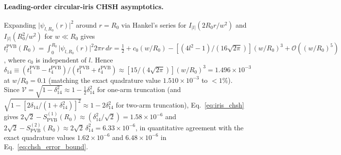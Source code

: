 \documentclass[aps,pra,onecolumn,notitlepage,11pt,tightenlines,nofootinbib,floatfix,longbibliography]{revtex4-2}
\newcommand{\abs}[1]{\lvert #1 \rvert}
\begin{document}
\paragraph*{Leading-order circular-iris CHSH asymptotics.}
Expanding $\abs{\psi_{l,R_0}(r)}^2$ around $r = R_0$ via Hankel's series for $I_{\abs{l}}(2R_0 r/w^2)$ and $I_{\abs{l}}(R_0^2/w^2)$ for $w \ll R_0$ gives $t_l^{\mathrm{PVB}}(R_0) = \int_0^{R_0}\abs{\psi_{l,R_0}(r)}^2 2\pi r\,dr = \frac{1}{2} + c_0(w/R_0) - [(4l^2 - 1)/(16\sqrt{2\pi})](w/R_0)^3 + \mathcal{O}((w/R_0)^5)$, where $c_0$ is independent of $l$. Hence $\delta_{14} \equiv (t_1^{\mathrm{PVB}} - t_4^{\mathrm{PVB}})/(t_1^{\mathrm{PVB}} + t_4^{\mathrm{PVB}}) \approx [15/(4\sqrt{2\pi})](w/R_0)^3 = 1.496\times 10^{-3}$ at $w/R_0 = 0.1$ (matching the exact quadrature value $1.510\times 10^{-3}$ to $<1\%$). Since $\mathcal{V} = \sqrt{1 - \delta_{14}^2} \approx 1 - \frac{1}{2}\delta_{14}^2$ for one-arm truncation (and $\sqrt{1 - [2\delta_{14}/(1+\delta_{14}^2)]^2} \approx 1 - 2\delta_{14}^2$ for two-arm truncation), Eq.~\eqref{eq:iris_chsh} gives $2\sqrt{2} - S_{\mathrm{PVB}}^{(1)}(R_0) \approx (\delta_{14}^2/\sqrt{2}) = 1.58\times 10^{-6}$ and $2\sqrt{2} - S_{\mathrm{PVB}}^{(2)}(R_0) \approx 2\sqrt{2}\,\delta_{14}^2 = 6.33\times 10^{-6}$, in quantitative agreement with the exact quadrature values $1.62\times 10^{-6}$ and $6.48\times 10^{-6}$ in Eq.~\eqref{eq:chsh_error_bound}.


\end{document}
